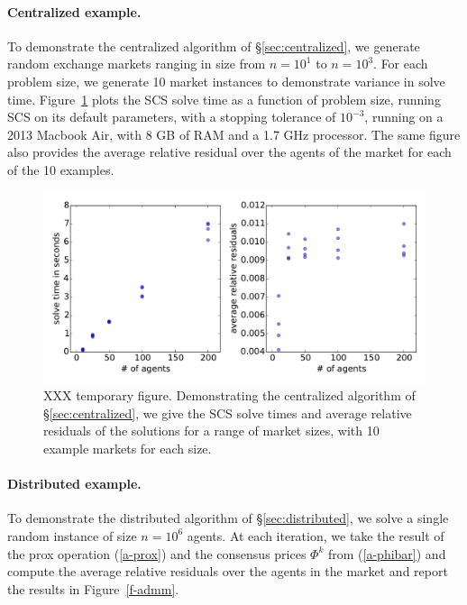 \documentclass[12pt]{article}
\begin{document}
\paragraph{Centralized example.}
To demonstrate the centralized algorithm of \S\ref{sec:centralized},
we generate random exchange markets ranging in size from $n=10^1$ to $n=10^3$.
For each problem size, we generate 10 market instances to demonstrate variance
in solve time. Figure~\ref{f-cvxpy} plots the SCS solve time as a function of
problem size, running SCS on its default parameters, with a stopping tolerance
of $10^{-3}$, running on a 2013 Macbook Air, with 8 GB of RAM and a 1.7 GHz
processor. The same figure also provides the average relative
residual over the agents of the market for each of the 10 examples.

\begin{figure}
\begin{center}
\includegraphics[width=1.0\textwidth]{figures/cvxpy}
\end{center}
\caption{XXX temporary figure.
Demonstrating the centralized algorithm of \S\ref{sec:centralized}, we give the
SCS solve times and average relative residuals of the solutions for a range of
market sizes, with 10 example markets for each size.
}
\label{f-cvxpy}
\end{figure}


\paragraph{Distributed example.}
To demonstrate the distributed algorithm of \S\ref{sec:distributed},
we solve a single random instance of size $n=10^6$ agents. At each iteration,
we take the result of the prox operation (\ref{a-prox}) and the consensus
prices $\Phi^k$ from (\ref{a-phibar}) and compute the average
relative residuals over the agents in the market and report the results in
Figure~\ref{f-admm}.
\end{document}
